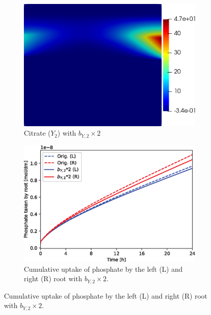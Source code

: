 \documentclass[11pt]{article}
\numberwithin{equation}{section}
\begin{document}
\begin{figure}[!htb]
\centering
\begin{subfigure}[t]{0.35\textwidth}
    \includegraphics[trim= 100 100 60 100,width=\textwidth]{Figures/Y2_bY2times2.png}
    \caption{Citrate ($Y_2$) with $b_{Y,2} \times 2$}
    \label{fig:numexp_by2up1}
\end{subfigure}
\hspace{1cm}
\begin{subfigure}[t]{0.4\textwidth}
    \includegraphics[width=\textwidth]{Figures/bY2times2.eps}
    \caption{Cumulative uptake of phosphate by the left (L) and right (R) root with $b_{Y,2} \times 2$.}
    \label{fig:numexp_by2up2}
\end{subfigure}


\end{figure}
\end{document}
